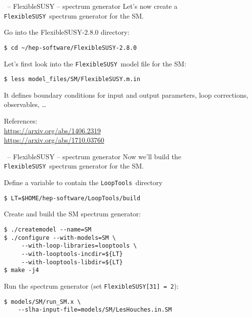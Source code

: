 \documentclass[11pt]{beamer}
\newcommand{\FlexibleSUSY}{\texttt{FlexibleSUSY}}
\newcommand{\LoopTools}{\texttt{LoopTools}}
\begin{document}

\begin{frame}[fragile]{\insertsection\ -- FlexibleSUSY -- spectrum generator}
  Let's now create a \FlexibleSUSY\ spectrum generator for the SM.

  \bigskip

  Go into the FlexibleSUSY-2.8.0 directory:
  \begin{lstlisting}
$ cd ~/hep-software/FlexibleSUSY-2.8.0\end{lstlisting}%
  Let's first look into the \FlexibleSUSY\ model file for the SM:
  \begin{lstlisting}
$ less model_files/SM/FlexibleSUSY.m.in\end{lstlisting}%
  It defines boundary conditions for input and output parameters, loop
  corrections, observables, \ldots

  \bigskip

  References:\\
  \url{https://arxiv.org/abs/1406.2319}\\
  \url{https://arxiv.org/abs/1710.03760}

\end{frame}


\begin{frame}[fragile]{\insertsection\ -- FlexibleSUSY -- spectrum generator}
  Now we'll build the \FlexibleSUSY\ spectrum generator for the SM.

  \bigskip

  Define a variable to contain the \LoopTools\ directory
  \begin{lstlisting}
$ LT=$HOME/hep-software/LoopTools/build\end{lstlisting}%
  Create and build the SM spectrum generator:
  \begin{lstlisting}
$ ./createmodel --name=SM
$ ./configure --with-models=SM \
     --with-loop-libraries=looptools \
     --with-looptools-incdir=${LT}
     --with-looptools-libdir=${LT}
$ make -j4\end{lstlisting}%
  Run the spectrum generator (set \texttt{FlexibleSUSY[31] = 2}):
  \begin{lstlisting}
$ models/SM/run_SM.x \
    --slha-input-file=models/SM/LesHouches.in.SM\end{lstlisting}%
\end{frame}
\end{document}
